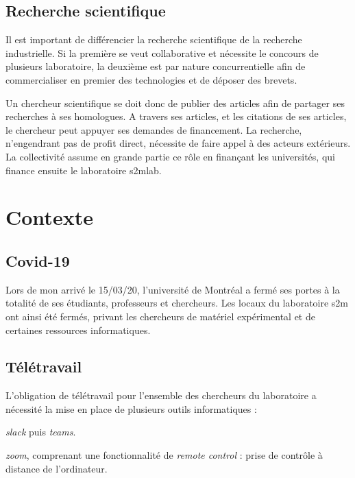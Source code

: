         \section{Recherche scientifique}
        
Il est important de différencier la recherche scientifique de la recherche industrielle. Si la première se veut collaborative et nécessite le concours de plusieurs laboratoire, la deuxième est par nature concurrentielle afin de commercialiser en premier des technologies et de déposer des brevets.


Un chercheur scientifique se doit donc de publier des articles afin de partager ses recherches à ses homologues. A travers ses articles, et les citations de ses articles, le chercheur peut appuyer ses demandes de financement. La recherche, n'engendrant pas de profit direct, nécessite de faire appel à des acteurs extérieurs. La collectivité assume en grande partie ce rôle en finançant les universités, qui finance ensuite le laboratoire s2mlab. %



    \chapter{Contexte}
        \section{Covid-19}
        
        
Lors de mon arrivé le 15/03/20, l'université de Montréal a fermé ses portes à la totalité de ses étudiants, professeurs et chercheurs. Les locaux du laboratoire s2m ont ainsi été fermés, privant les chercheurs de matériel expérimental et de certaines ressources informatiques.

        \section{Télétravail}

L'obligation de télétravail pour l’ensemble des chercheurs du laboratoire a nécessité la mise en place de plusieurs outils informatiques :

\begin{description}
\setlength\itemsep{-0.5em}
\item[Messagerie :] \emph{\gls{slack}} puis \emph{\gls{teams}}.
\item[Visioconférence :] \emph{\gls{zoom}}, comprenant une fonctionnalité de \emph{remote control} : prise de contrôle à distance de l'ordinateur.
\end{description}

